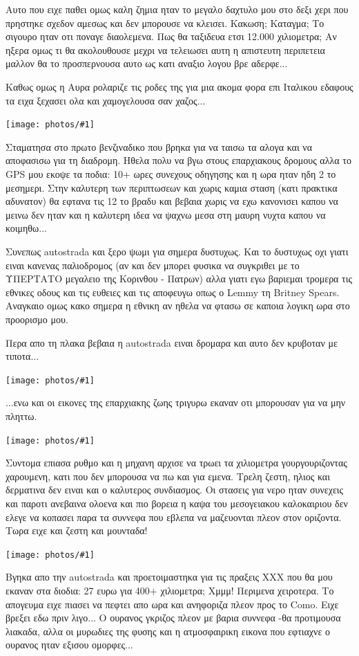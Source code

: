 \documentclass[11pt, letterpaper]{book}
\newcommand\photo[1]{\noindent\texttt{[image: photos/\#1]}}
\begin{document}
Αυτο που ειχε παθει ομως καλη ζημια ηταν το μεγαλο δαχτυλο μου στο δεξι χερι που πρηστηκε σχεδον αμεσως και δεν μπορουσε να κλεισει. Κακωση; Καταγμα; Το σιγουρο ηταν οτι ποναγε διαολεμενα. Πως θα ταξιδευα ετσι 12.000 χιλιομετρα; Αν ηξερα ομως τι θα ακολουθουσε μεχρι να τελειωσει αυτη η απιστευτη περιπετεια μαλλον θα το προσπερνουσα αυτο ως κατι αναξιο λογου βρε αδερφε...

Καθως ομως η Αυρα ρολαριζε τις ροδες της για μια ακομα φορα επι Ιταλικου εδαφους τα ειχα ξεχασει ολα και χαμογελουσα σαν χαζος...

\photo{8.jpg}

Σταματησα στο πρωτο βενζιναδικο που βρηκα για να ταισω τα αλογα και να αποφασισω για τη διαδρομη. Ηθελα πολυ να βγω στους επαρχιακους δρομους αλλα το GPS μου εκοψε τα ποδια: 10+ ωρες συνεχους οδηγησης και η ωρα ηταν ηδη 2 το μεσημερι. Στην καλυτερη των περιπτωσεων και χωρις καμια σταση (κατι πρακτικα αδυνατον) θα εφτανα τις 12 το βραδυ και βεβαια χωρις να εχω κανονισει καπου να μεινω δεν ηταν και η καλυτερη ιδεα να ψαχνω μεσα στη μαυρη νυχτα καπου να κοιμηθω...

Συνεπως autostrada και ξερο ψωμι για σημερα δυστυχως.
Και το δυστυχως οχι γιατι ειναι κανενας παλιοδρομος (αν και δεν μπορει φυσικα να συγκριθει με το ΥΠΕΡΤΑΤΟ μεγαλειο της Κορινθου - Πατρων) αλλα γιατι εγω βαριεμαι τρομερα τις εθνικες οδους και τις ευθειες και τις αποφευγω οπως ο Lemmy τη Britney Spears. Αναγκαιο ομως κακο σημερα η εθνικη αν ηθελα να φτασω σε καποια λογικη ωρα στο προορισμο μου.

Περα απο τη πλακα βεβαια η autostrada ειναι δρομαρα και αυτο δεν κρυβοταν με τιποτα...

\photo{9.jpg}

...ενω και οι εικονες της επαρχιακης ζωης τριγυρω εκαναν οτι μπορουσαν για να μην πληττω.

\photo{10.jpg}

Συντομα επιασα ρυθμο και η μηχανη αρχισε να τρωει τα χιλιομετρα γουργουριζοντας χαρουμενη, κατι που δεν μπορουσα να πω και για εμενα. Τρελη ζεστη, ηλιος και δερματινα δεν ειναι και ο καλυτερος συνδιασμος. 
Οι στασεις για νερο ηταν συνεχεις και παροτι ανεβαινα ολοενα και πιο βορεια η καψα του μεσογειακου καλοκαιριου δεν ελεγε να κοπασει παρα τα συννεφα που εβλεπα να μαζευονται πλεον στον οριζοντα. 
Τωρα ειχε και ζεστη και μουνταδα!

\photo{11.jpg}

Βγηκα απο την autostrada και προετοιμαστηκα για τις πραξεις ΧΧΧ που θα μου εκαναν στα διοδια: 27 ευρω για 400+ χιλιομετρα; Χμμμ! Περιμενα χειροτερα.
Το απογευμα ειχε πιασει να πεφτει απο ωρα και ανηφοριζα πλεον προς το Como. Ειχε βρεξει εδω πριν λιγο... Ο ουρανος γκριζος πλεον με βαρια συννεφα -θα προτιμουσα λιακαδα, αλλα οι μυρωδιες της φυσης και η ατμοσφαιρικη εικονα που εφτιαχνε ο ουρανος ηταν εξισου ομορφες...
\end{document}
